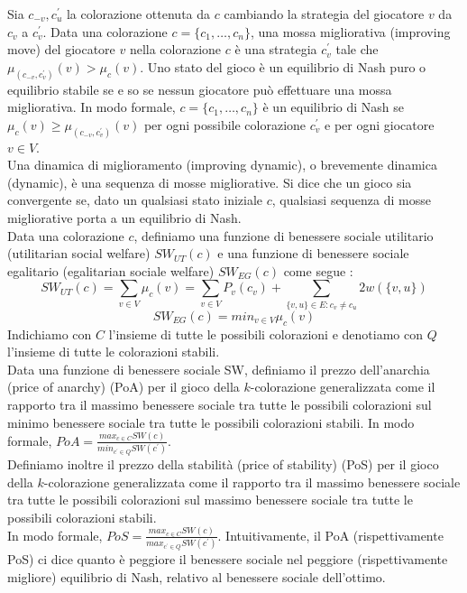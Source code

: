 Sia \(c_{-v}, c_u^{\prime}\) la colorazione ottenuta da \(c\) cambiando la strategia del giocatore \(v\) da \(c_v\) a \(c_v^{\prime}\). Data una colorazione \(c = \{c_1,\ldots,c_n\}\), una mossa migliorativa (improving move) del giocatore \(v\) nella colorazione \(c\) è una strategia \(c_v^{\prime}\) tale che \(\mu_{(c_{-v}, c_v^{\prime})} (v) > \mu_c (v)\). Uno stato del gioco è un equilibrio di Nash puro o equilibrio stabile se e so se nessun giocatore può effettuare una mossa migliorativa. In modo formale, \(c = \{c_1,\ldots,c_n\}\) è un equilibrio di Nash se \(\mu_c (v) \geq \mu_{(c_{-v}, c_v^{\prime})} (v)\) per ogni possibile colorazione \(c_v^{\prime}\) e per ogni giocatore \(v \in V\).\\
Una dinamica di miglioramento (improving dynamic), o brevemente dinamica (dynamic), è una sequenza di mosse migliorative. Si dice che un gioco sia convergente se, dato un qualsiasi stato iniziale \(c\), qualsiasi sequenza di mosse migliorative porta a un equilibrio di Nash.\\
Data una colorazione \(c\), definiamo una funzione di benessere sociale utilitario (utilitarian social welfare) \(SW_{UT}(c)\) e una funzione di benessere sociale egalitario (egalitarian sociale welfare) \(SW_{EG}(c)\) come segue :
\[SW_{UT} (c) = \sum_{v \in V} \mu_c (v) = \sum_{v \in V} P_v(c_v) + \sum_{\{v, u\} \in E : c_v \neq c_u} 2w(\{v, u\})\]
\[SW_{EG} (c) = min_{v \in V} \mu_c (v)\]
Indichiamo con \(C\) l'insieme di tutte le possibili colorazioni e denotiamo con \(Q\) l'insieme di tutte le colorazioni stabili.\\
Data una funzione di benessere sociale SW, definiamo il prezzo dell'anarchia (price of anarchy) (PoA) per il gioco della \(k\)-colorazione generalizzata come il rapporto tra il massimo benessere sociale tra tutte le possibili colorazioni sul minimo benessere sociale tra tutte le possibili colorazioni stabili. In modo formale, \(PoA = \frac{max_{c \in C} SW(c)}{min_{c^{\prime} \in Q} SW(c^{\prime})}\).\\
Definiamo inoltre il prezzo della stabilità (price of stability) (PoS) per il gioco della \(k\)-colorazione generalizzata come il rapporto tra il massimo benessere sociale tra tutte le possibili colorazioni sul massimo benessere sociale tra tutte le possibili colorazioni stabili.\\
In modo formale, \(PoS = \frac{max_{c \in C} SW(c)}{max_{c^{\prime} \in Q} SW(c^{\prime})}\). Intuitivamente, il PoA (rispettivamente PoS) ci dice quanto è peggiore il benessere sociale nel peggiore (rispettivamente migliore) equilibrio di Nash, relativo al benessere sociale dell'ottimo.\\

